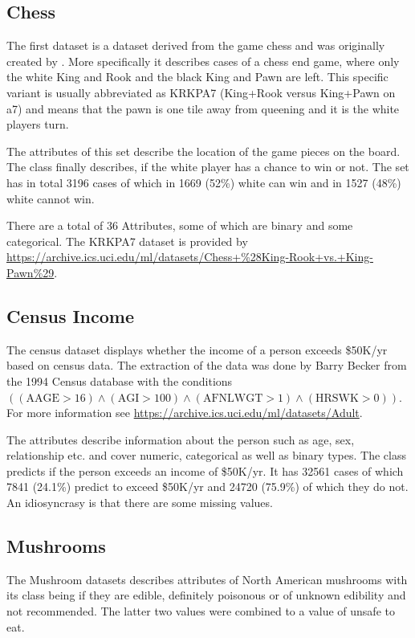 \documentclass[a4paper,preprint]{sig-alternate-xt}
\begin{document}
\subsection{Chess}
The first dataset is a dataset derived from the game chess and was originally created by \citet{chess}. More specifically it describes cases of a chess end game, where only the white King and Rook and the black King and Pawn are left. This specific variant is usually abbreviated as KRKPA7 (King+Rook versus King+Pawn on a7) and means that the pawn is one tile away from queening and it is the white players turn.

The attributes of this set describe the location of the game pieces on the board. The class finally describes, if the white player has a chance to win or not. The set has in total 3196 cases of which in 1669 (52\%) white can win and in 1527 (48\%) white cannot win.

There are a total of 36 Attributes, some of which are binary and some categorical. The KRKPA7 dataset is provided by \url{https://archive.ics.uci.edu/ml/datasets/Chess+\%28King-Rook+vs.+King-Pawn\%29}.

\subsection{Census Income}
The census dataset displays whether the income of a person exceeds \$50K/yr based on census data. The extraction of the data was done by Barry Becker from the 1994 Census database with the conditions $((\text{AAGE}>16) \land (\text{AGI}>100) \land (\text{AFNLWGT}>1) \land (\text{HRSWK}>0))$. For more information see \url{https://archive.ics.uci.edu/ml/datasets/Adult}.

The attributes describe information about the person such as age, sex, relationship etc. and cover numeric, categorical as well as binary types. The class predicts if the person exceeds an income of \$50K/yr.
It has 32561 cases of which 7841 (24.1\%) predict to exceed \$50K/yr and 24720 (75.9\%) of which they do not. An idiosyncrasy is that there are some missing values.

\subsection{Mushrooms}
The Mushroom datasets describes attributes of North American mushrooms with its class being if they are edible, definitely poisonous or of unknown edibility and not recommended. The latter two values were combined to a value of unsafe to eat.
\end{document}
